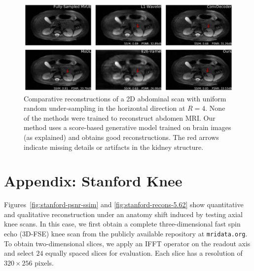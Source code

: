 \documentclass{article}
\begin{document}
\begin{figure}
    \centering
    \includegraphics[width=\columnwidth]{abdomen-random-horizontal-R=4-slice=10-comp-annotated.pdf}
    \caption{\small Comparative reconstructions of a 2D abdominal scan with uniform random under-sampling in the horizontal direction at $R=4$. None of the methods were trained to reconstruct abdomen MRI. Our method uses a score-based generative model trained on brain images (as explained) and obtains good reconstructions. The red arrows indicate missing details or artifacts in the kidney structure. 
    }
    \label{fig:abdomen-slice-8}
\end{figure}


\section{Appendix: Stanford Knee}\label{app:3d-knees}
Figures~\ref{fig:stanford-psnr-ssim} and
\ref{fig:stanford-recons-5.62} show quantitative and qualitative
reconstruction under an anatomy shift induced by testing axial knee
scans. In this case, we first obtain a complete three-dimensional fast
spin echo (3D-FSE) knee scan from the publicly available repository at
\texttt{mridata.org}. To obtain two-dimensional slices, we apply an
IFFT operator on the readout axis and select $24$ equally spaced
slices for evaluation. Each slice has a resolution of $320 \times 256$
pixels.
\end{document}
